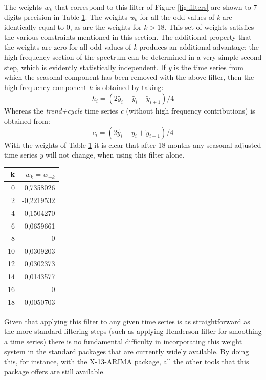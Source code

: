 \documentclass[english,blauw]{cbsdiscussionpaper}
\begin{document}
The weights $w_k$ that correspond to this filter of Figure \ref{fig:filters} are shown to 7 digits precision in Table \ref{tab:digits}. The weights \textit{w$_k$} for all the odd values of \textit{k} are identically equal to 0, as are the weights for $ k>18$. This set of weights satisfies the various constraints mentioned in this section. The additional property that the weights are zero for all odd values of\textit{ k} produces an additional advantage: the high frequency section of the spectrum can be determined in a very simple second step, which is evidently statistically independent. If \textit{y} is the time series from which the seasonal component has been removed with the above filter, then the high frequency component \textit{h} is obtained by taking:
\begin{equation}
h_i = (2 \tilde{y_i} - \tilde{y_i} - \tilde{y}_{i+1})/4
\end{equation}
Whereas the \textit{trend+cycle} time series \textit{c} (without high frequency contributions) is obtained from:
\begin{equation}
c_i = (2\tilde{y_i}+\tilde{y_i}+\tilde{y}_{i+1})/4
\end{equation}
With the weights of Table \ref{tab:digits} it is clear that after 18 months any seasonal adjusted time series \textit{y} will not change, when using this filter alone.\\
\bigskip
\begin{table}[h]
\label{tab:digits}
\centering
\begin{tabular}{r r}
k & $w_k=w_{-k}$\\
\hline
0 & 0,7358026\\
2 & -0,2219532\\
4 & -0,1504270\\
6 & -0,0659661\\
8 & 0\\
10 & 0,0309203\\
12 & 0,0302373\\
14 & 0,0143577\\
16 & 0\\
18 & -0,0050703\\
\hline
\end{tabular}
\end{table}
Given that applying this filter to any given time series is as straightforward as the more standard filtering steps (such as applying Henderson filter for smoothing a time series) there is no fundamental difficulty in incorporating this weight system in the standard packages that are currently widely available. By doing this, for instance, with the X-13-ARIMA package, all the other tools that this package offers are still available.
\end{document}
